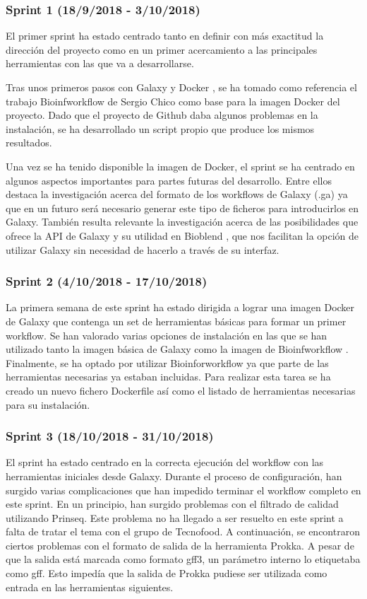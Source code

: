 \subsubsection{Sprint 1 (18/9/2018 - 3/10/2018)}
El primer sprint ha estado centrado tanto en definir con más exactitud la dirección del proyecto como en un primer acercamiento a las principales herramientas con las que va a desarrollarse. 

Tras unos primeros pasos con Galaxy \cite{1} y Docker \cite{2}, se ha tomado como referencia el trabajo Bioinfworkflow de Sergio Chico \cite{3} como base para la imagen Docker del proyecto. Dado que el proyecto de Github daba algunos problemas en la instalación, se ha desarrollado un script propio que produce los mismos resultados.

Una vez se ha tenido disponible la imagen de Docker, el sprint se ha centrado en algunos aspectos importantes para partes futuras del desarrollo. Entre ellos destaca la investigación acerca del formato de los workflows de Galaxy (.ga) ya que en un futuro será necesario generar este tipo de ficheros para introducirlos en Galaxy. También resulta relevante la investigación acerca de las posibilidades que ofrece la API de Galaxy \cite{3} y su utilidad en Bioblend \cite{4}, que nos facilitan la opción de utilizar Galaxy sin necesidad de hacerlo a través de su interfaz.

\subsubsection{Sprint 2 (4/10/2018 - 17/10/2018)}
La primera semana de este sprint ha estado dirigida a lograr una imagen Docker de Galaxy que contenga un set de herramientas básicas para formar un primer workflow. Se han valorado varias opciones de instalación en las que se han utilizado tanto la imagen básica de Galaxy \cite{6} como la imagen de Bioinfworkflow \cite{3}. Finalmente, se ha optado por utilizar Bioinforworkflow ya que parte de las herramientas necesarias ya estaban incluidas. 
Para realizar esta tarea se ha creado un nuevo fichero Dockerfile así como el listado de herramientas necesarias para su instalación.

\subsubsection{Sprint 3 (18/10/2018 - 31/10/2018)}
El sprint ha estado centrado en la correcta ejecución del workflow con las herramientas iniciales desde Galaxy. Durante el proceso de configuración, han surgido varias complicaciones que han impedido terminar el workflow completo en este sprint. 
En un principio, han surgido problemas con el filtrado de calidad utilizando Prinseq. Este problema no ha llegado a ser resuelto en este sprint a falta de tratar el tema con el grupo de Tecnofood.
A continuación, se encontraron ciertos problemas con el formato de salida de la herramienta Prokka. A pesar de que la salida está marcada como formato gff3, un parámetro interno lo etiquetaba como gff. Esto impedía que la salida de Prokka pudiese ser utilizada como entrada en las herramientas siguientes.

